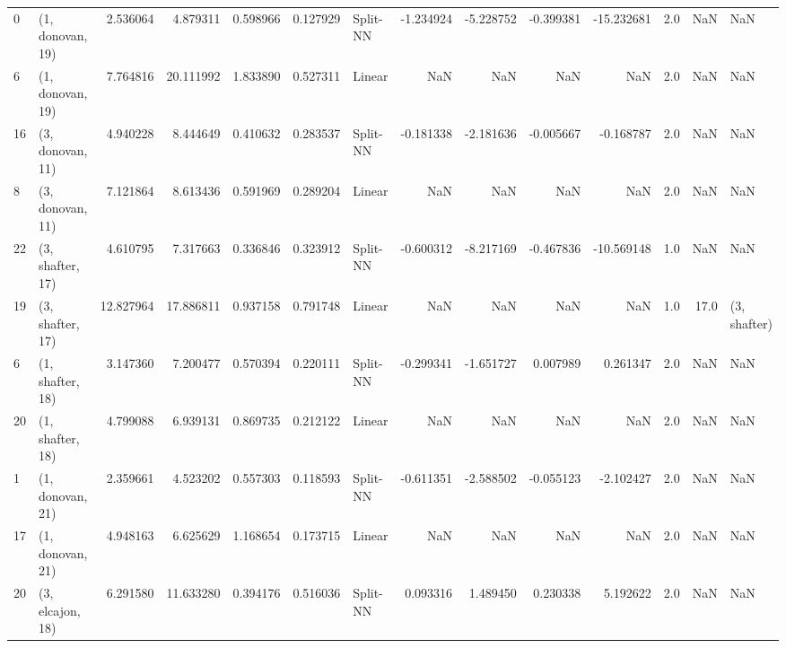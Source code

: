 \begin{tabular}{llrrrrlrrrrrrl}
0  &  (1, donovan, 19) &   2.536064 &   4.879311 &   0.598966 &  0.127929 &    Split-NN &       -1.234924 &     -5.228752 &      -0.399381 &   -15.232681 &            2.0 &    NaN &              NaN \\
6  &  (1, donovan, 19) &   7.764816 &  20.111992 &   1.833890 &  0.527311 &      Linear &             NaN &           NaN &            NaN &          NaN &            2.0 &    NaN &              NaN \\
16 &  (3, donovan, 11) &   4.940228 &   8.444649 &   0.410632 &  0.283537 &    Split-NN &       -0.181338 &     -2.181636 &      -0.005667 &    -0.168787 &            2.0 &    NaN &              NaN \\
8  &  (3, donovan, 11) &   7.121864 &   8.613436 &   0.591969 &  0.289204 &      Linear &             NaN &           NaN &            NaN &          NaN &            2.0 &    NaN &              NaN \\
22 &  (3, shafter, 17) &   4.610795 &   7.317663 &   0.336846 &  0.323912 &    Split-NN &       -0.600312 &     -8.217169 &      -0.467836 &   -10.569148 &            1.0 &    NaN &              NaN \\
19 &  (3, shafter, 17) &  12.827964 &  17.886811 &   0.937158 &  0.791748 &      Linear &             NaN &           NaN &            NaN &          NaN &            1.0 &   17.0 &     (3, shafter) \\
6  &  (1, shafter, 18) &   3.147360 &   7.200477 &   0.570394 &  0.220111 &    Split-NN &       -0.299341 &     -1.651727 &       0.007989 &     0.261347 &            2.0 &    NaN &              NaN \\
20 &  (1, shafter, 18) &   4.799088 &   6.939131 &   0.869735 &  0.212122 &      Linear &             NaN &           NaN &            NaN &          NaN &            2.0 &    NaN &              NaN \\
1  &  (1, donovan, 21) &   2.359661 &   4.523202 &   0.557303 &  0.118593 &    Split-NN &       -0.611351 &     -2.588502 &      -0.055123 &    -2.102427 &            2.0 &    NaN &              NaN \\
17 &  (1, donovan, 21) &   4.948163 &   6.625629 &   1.168654 &  0.173715 &      Linear &             NaN &           NaN &            NaN &          NaN &            2.0 &    NaN &              NaN \\
20 &  (3, elcajon, 18) &   6.291580 &  11.633280 &   0.394176 &  0.516036 &    Split-NN &        0.093316 &      1.489450 &       0.230338 &     5.192622 &            2.0 &    NaN &              NaN \\

\end{tabular}

